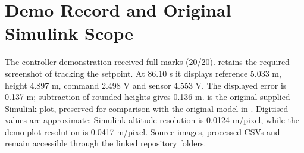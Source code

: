 \section{Demo Record and Original Simulink Scope}\label{app:demo}\label{app:simulink}
The controller demonstration received full marks (20/20).  retains the required screenshot of tracking the setpoint. At 86.10 s it displays reference 5.033 m, height 4.897 m, command 2.498 V and sensor 4.553 V. The displayed error is 0.137 m; subtraction of rounded heights gives 0.136 m.
 is the original supplied Simulink plot, preserved for comparison with the original model in . 
Digitised values are approximate: Simulink altitude resolution is 0.0124 m/pixel, while the demo plot resolution is 0.0417 m/pixel. Source images, processed CSVs and  remain accessible through the linked repository folders.
\page

